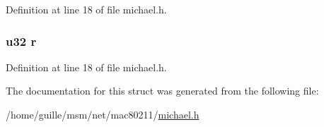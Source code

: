 Definition at line 18 of file michael.\-h.

\hypertarget{structmichael__mic__ctx_a4c24b5b7511b13fa815f1ef250c4d40a}{
\subsubsection[{r}]{\setlength{\rightskip}{0pt plus 5cm}u32 r}}\label{structmichael__mic__ctx_a4c24b5b7511b13fa815f1ef250c4d40a}


Definition at line 18 of file michael.\-h.



The documentation for this struct was generated from the following file\-:\begin{DoxyCompactItemize}
\item 
/home/guille/msm/net/mac80211/\hyperlink{michael_8h}{michael.\-h}\end{DoxyCompactItemize}
